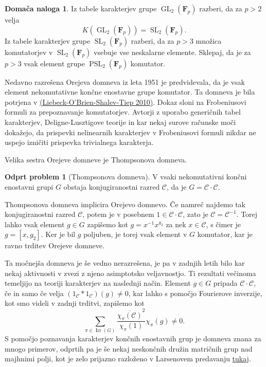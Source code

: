 \documentclass[11pt]{book}
\def\conclass{\mathcal{C}}
\def\FF{\mathbf{F}}
\DeclareMathOperator\Irr{Irr}
\DeclareMathOperator\GL{GL}
\DeclareMathOperator\SL{SL}
\DeclareMathOperator\PSL{PSL}
\theoremstyle{definition}
\theoremstyle{zgled}
\theoremstyle{odprtproblem}
\newtheorem*{odprtproblem}{Odprt problem}
\theoremstyle{domacanaloga}
\newtheorem*{domacanaloga}{Domača naloga}
\theoremstyle{izrek}
\begin{document}
\begin{domacanaloga}
Iz tabele karakterjev grupe $\GL_2(\FF_p)$ razberi, da za $p>2$ velja
\[
    \textstyle K(\GL_2(\FF_p)) = \SL_2(\FF_p).
\]
Iz tabele karakterjev grupe $\SL_2(\FF_p)$ razberi, da za $p>3$ množica komutatorjev v $\SL_2(\FF_p)$ vsebuje vse neskalarne elemente. Sklepaj, da je za $p>3$ vsak element grupe $\PSL_2(\FF_p)$ komutator.
\end{domacanaloga}

Nedavno razrešena Orejeva domneva iz leta 1951 je predvidevala, da je vsak element nekomutativne končne enostavne grupe komutator. Ta domneva je bila potrjena v \href{https://ems.press/journals/jems/articles/3979}{(Liebeck-O'Brien-Shalev-Tiep 2010)}. Dokaz sloni na Frobeniusovi formuli za prepoznavanje komutatorjev. Avtorji z uporabo generičnih tabel karakterjev, Deligne-Lusztigove teorije in kar nekaj surove računske moči dokažejo, da prispevki nelinearnih karakterjev v Frobeniusovi formuli nikdar ne uspejo izničiti prispevka trivialnega karakterja.

Velika sestra Orejeve domneve je Thompsonova domneva.

\begin{odprtproblem}[Thompsonova domneva]
V vsaki nekomutativni končni enostavni grupi $G$ obstaja konjugiranostni razred $\conclass$, da je $G = \conclass \cdot \conclass$.
\end{odprtproblem}

Thompsonova domneva implicira Orejevo domnevo. Če namreč najdemo tak konjugiranostni razred $\conclass$, potem je v posebnem $1 \in \conclass \cdot \conclass$, zato je $\conclass = \conclass^{-1}$. Torej lahko vsak element $g \in G$ zapišemo kot $g = x^{-1} x^{g_2}$ za nek $x \in \conclass$, s čimer je $g = [x, g_2]$. Ker je bil $g$ poljuben, je torej vsak element v $G$ komutator, kar je ravno trditev Orejeve domneve. 

Ta močnejša domneva je še vedno nerazrešena, je pa v zadnjih letih bilo kar nekaj aktivnosti v zvezi z njeno asimptotsko veljavnostjo. Ti rezultati večinoma temeljijo na teoriji karakterjev na naslednji način. Element $g \in G$ pripada $\conclass \cdot \conclass$, če in samo če velja $(1_{\conclass} * 1_{\conclass})(g) \neq 0$, kar lahko s pomočjo Fourierove inverzije, kot smo videli v zadnji trditvi, zapišemo kot
\[
    \sum_{\pi \in \Irr(G)} \frac{\overline{\chi_{\pi}(\conclass)}^2}{\chi_{\pi}(1)} \chi_{\pi}(g) \neq 0.
\]
S pomočjo poznavanja karakterjev končnih enostavnih grup je domneva znana za mnogo primerov, odprtih pa je še nekaj neskončnih družin matričnih grup nad majhnimi polji, kot je zelo prijazno razloženo v Larsenovem predavanju \href{https://www.youtube.com/watch?v=OQFFYaCYzq4}{tukaj}.
\end{document}
